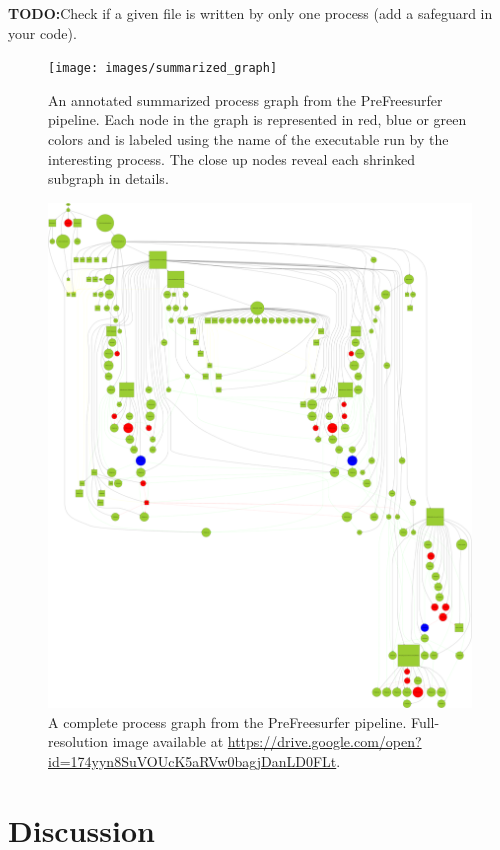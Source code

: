 \documentclass{article}
\newcommand{\todo}[1]{\color{red}\textbf{TODO:}#1\color{black}}
\begin{document}
\todo{Check if a given file is written by only one process (add a safeguard in your code).}

\begin{figure}
  \texttt{[image: images/summarized\_graph]}
  \caption{An annotated summarized process graph from the PreFreesurfer pipeline.
Each node in the graph is represented in red, blue or green colors and is labeled 
using the name of the executable run by the interesting process. The close up nodes 
reveal each shrinked subgraph in details.}
  \label{fig:summarized-graph}
\end{figure}

\begin{figure}
  \includegraphics[width=\linewidth]{images/graph}
  \caption{A complete process graph from the PreFreesurfer pipeline.
Full-resolution image available at \url{https://drive.google.com/open?id=174yyn8SuVOUcK5aRVw0bagjDanLD0FLt}.}
  \label{fig:complete-graph}
\end{figure}

\section{Discussion}
\end{document}

